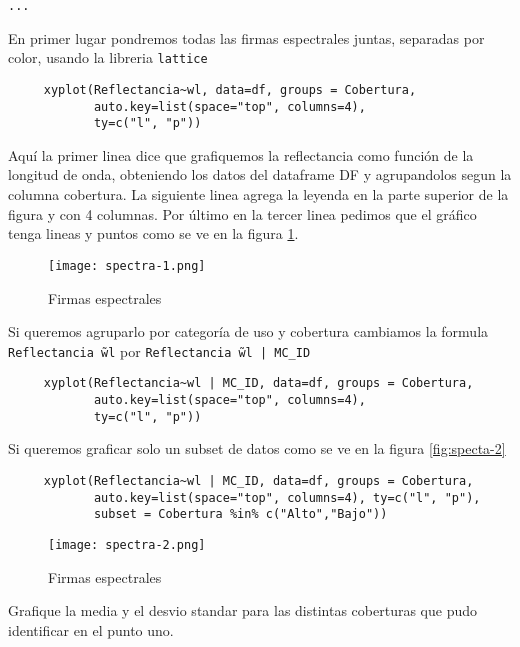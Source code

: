 \begin{exa}
\begin{Verbatim}[fontsize=\small]
     ...
     \end{Verbatim}
     En primer lugar pondremos todas las firmas espectrales juntas, separadas
     por color, usando la libreria \texttt{lattice}
     \begin{lstlisting}
     xyplot(Reflectancia~wl, data=df, groups = Cobertura,
            auto.key=list(space="top", columns=4),
            ty=c("l", "p"))
     \end{lstlisting}
     Aqu\'i la primer linea dice que grafiquemos la reflectancia como funci\'on de
     la longitud de onda, obteniendo los datos del dataframe DF y agrupandolos
     segun la columna cobertura. La siguiente linea agrega la leyenda en la
     parte superior de la figura y con 4 columnas. Por \'ultimo en la tercer linea
     pedimos que el gr\'afico tenga lineas y puntos como se ve en la figura
     \ref{fig:spectra-1}.

     \begin{figure}[h!]
     \begin{center}
         \texttt{[image: spectra-1.png]}
     \end{center}
     \caption{Firmas espectrales}
     \label{fig:spectra-1}
     \end{figure}

     Si queremos agruparlo por categor\'ia de uso y cobertura cambiamos la formula
     \texttt{Reflectancia \~ wl} por \texttt{Reflectancia \~ wl | MC\_ID}
     \begin{lstlisting}
     xyplot(Reflectancia~wl | MC_ID, data=df, groups = Cobertura,
            auto.key=list(space="top", columns=4),
            ty=c("l", "p"))
     \end{lstlisting}

     Si queremos graficar solo un subset de datos como se ve en la figura
     \ref{fig:specta-2}

     \begin{lstlisting}
     xyplot(Reflectancia~wl | MC_ID, data=df, groups = Cobertura,
            auto.key=list(space="top", columns=4), ty=c("l", "p"),
            subset = Cobertura %in% c("Alto","Bajo"))
     \end{lstlisting}
     \begin{figure}[h!]
     \begin{center}
         \texttt{[image: spectra-2.png]}
     \end{center}
     \caption{Firmas espectrales}
     \label{fig:spectra-2}
     \end{figure}
 \end{exa}

\begin{act}
    Grafique la media y el desvio standar para las distintas coberturas que pudo
     identificar en el punto uno.
\end{act}
